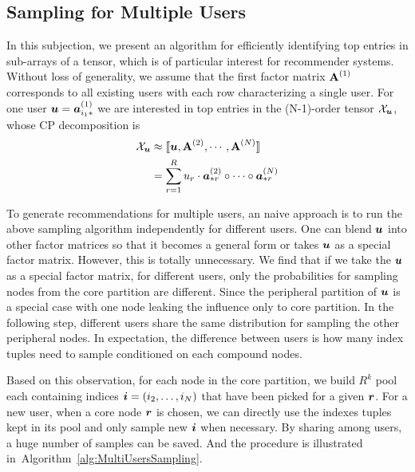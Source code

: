 \documentclass[10pt,journal,compsoc]{IEEEtran}
\newcommand{\T}[1]{\mathcal{#1}}
\newcommand{\KT}[1]{\llbracket #1 \rrbracket}
\newcommand{\V}[1]{{\boldsymbol{{\MakeLowercase{#1}}}}}
\newcommand{\RowVecA}[1]{\V{a}^{(#1)}_{i_#1*}}
\newcommand{\ColVecA}[1]{\V{a}^{(#1)}_{*r}}
\newcommand{\predx}{\hat{x}_{\V{i}}}
\newcommand{\M}[1]{{\textbf{{\MakeUppercase{#1}}}}}
\newcommand{\FacMat}[2]{\M{#1}^{(#2)}}
\newcommand{\Alg}[1]{Algorithm~\ref{alg:#1}}
\begin{document}

\subsection{Sampling for Multiple Users}

In this subjection, we present an algorithm for efficiently identifying top entries in sub-arrays of a tensor, which is of particular interest for recommender systems. Without loss of generality, we assume that the first factor matrix $\FacMat{A}{1}$ corresponds to all existing users with each row characterizing a single user. For one user $\V{u} = \RowVecA{1}$ we are interested in top entries in the (N-1)-order tensor $\T{X}_\V{u}$, whose CP decomposition is
\begin{align}
\label{eq:UserCP}
\T{X}_{\V{u}} &\approx \KT{\V{u},\FacMat{A}{2},\cdots,\FacMat{A}{N}} \\ \notag
&=\sum_{r=1}^Ru_r\cdot\ColVecA{2}\circ\cdots\circ\ColVecA{N}
\end{align}

To generate recommendations for multiple users, an naive approach is to run the above sampling algorithm independently for different users. One can blend $\V{u}$ into other factor matrices so that it becomes a general form or takes $\V{u}$ as a special factor matrix. However, this is totally unnecessary. We find that if we take the $\V{u}$ as a special factor matrix, for different users, only the probabilities for sampling nodes from the core partition are different. Since the peripheral partition of $\V{u}$ is a special case with one node leaking the influence only to core partition. In the following step, different users share the same distribution for sampling the other peripheral nodes. In expectation, the difference between users is how many index tuples need to sample conditioned on each compound nodes. 

Based on this observation, for each node in the core partition, we build $R^k$ pool each containing indices $\V{i}=(i_2,\ldots,i_N)$ that have been picked for a given $\V{r}$. For a new user, when a core node $\V{r}$ is chosen, we can directly use the indexes tuples kept in its pool and only sample new $\V{i}$ when necessary. By sharing among users, a huge number of samples can be saved. And the procedure is illustrated in~\Alg{MultiUsersSampling}.
\end{document}
